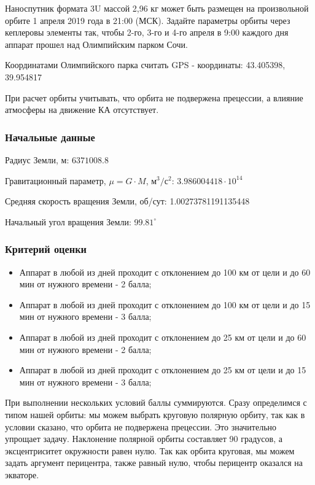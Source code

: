 
Наноспутник формата 3U массой 2,96 кг может быть размещен на произвольной орбите 1 апреля 2019 года в 21:00 (МСК). Задайте параметры орбиты через кеплеровы элементы так, чтобы 2-го, 3-го и 4-го апреля в 9:00 каждого дня аппарат прошел над Олимпийским парком Сочи.

Координатами Олимпийского парка считать GPS - координаты: 43.405398, 39.954817

При расчет орбиты учитывать, что орбита не подвержена прецессии, а влияние атмосферы на движение КА отсутствует.

\subsubsection*{Начальные данные}

Радиус Земли, м: $6371008.8$

Гравитационный параметр, $\mu = G \cdot M$, м$^3/$с$^2$: $3.986004418 \cdot 10^{14}$

Средняя скорость вращения Земли, об/сут: 1.00273781191135448

Начальный угол вращения Земли: 9$9.81^{\circ}$

\subsubsection*{Критерий оценки}

\begin{itemize}
    \item Аппарат в любой из дней проходит с отклонением до 100 км от цели и до 60 мин от нужного времени - 2 балла;
    \item Аппарат в любой из дней проходит с отклонением до 100 км от цели и до 15 мин от нужного времени - 3 балла;
    \item Аппарат в любой из дней проходит с отклонением до 25 км от цели и до 60 мин от нужного времени - 2 балла;
    \item Аппарат в любой из дней проходит с отклонением до 25 км от цели и до 15 мин от нужного времени - 3 балла;
\end{itemize}

При выполнении нескольких условий баллы суммируются.
\solutionSection
Сразу определимся с типом нашей орбиты: мы можем выбрать круговую полярную орбиту, так как в условии сказано, что орбита не подвержена прецессии. Это значительно упрощает задачу. 
Наклонение полярной орбиты составляет 90 градусов, а эксцентриситет окружности равен нулю. Так как орбита круговая, мы можем задать аргумент перицентра, также равный нулю, чтобы перицентр оказался на экваторе.

